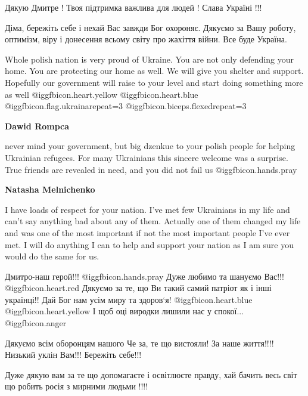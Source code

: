 \begin{itemize}
Дякую Дмитре ! Твоя підтримка важлива для людей ! Слава Україні !!!


Діма, бережіть себе і нехай Вас завжди Бог охороняє. Дякуємо за Вашу роботу,
оптимізм, віру і донесення всьому світу про жахіття війни. Все буде Україна.


Whole polish nation is very proud of Ukraine. You are not only defending your
home. You are protecting our home as well. We will give you shelter and
support. Hopefully our government will raise to your level and start doing
something more as well @igg{fbicon.heart.yellow}  @igg{fbicon.heart.blue} @igg{fbicon.flag.ukraina}{repeat=3} @igg{fbicon.biceps.flexed}{repeat=3} 

\begin{itemize} %
\textbf{Dawid Rompca} 

never mind your government, but big dzenkue to your polish people for helping
Ukrainian refugees. For many Ukrainians this sincere welcome was a surprise.
True friends are revealed in need, and you did not fail us  @igg{fbicon.hands.pray} 

\textbf{Natasha Melnichenko} 

I have loads of respect for your nation. I've met few Ukrainians in my life and
can't say anything bad about any of them. Actually one of them changed my life
and was one of the most important if not the most important people I've ever
met. I will do anything I can to help and support your nation as I am sure you
would do the same for us.

\end{itemize} %


\obeycr
Дмитро-наш герой!!! @igg{fbicon.hands.pray} 
Дуже любимо та шануємо Вас!!! @igg{fbicon.heart.red}
Дякуємо за те, що Ви такий самий патріот як і інші українці!!
Дай Бог нам усім миру та здоров‘я! @igg{fbicon.heart.blue}  @igg{fbicon.heart.yellow} 
І щоб оці виродки лишили нас у спокої... @igg{fbicon.anger} 
\restorecr


Дякуємо всім оборонцям нашого Че за, те що вистояли! За наше життя!!!! Низький
уклін Вам!!! Бережіть себе!!!

Дуже дякую вам за те що допомагаєте і освітлюєте правду, хай бачить весь світ
що робить росія з мирними людьми !!!!


\end{itemize}

